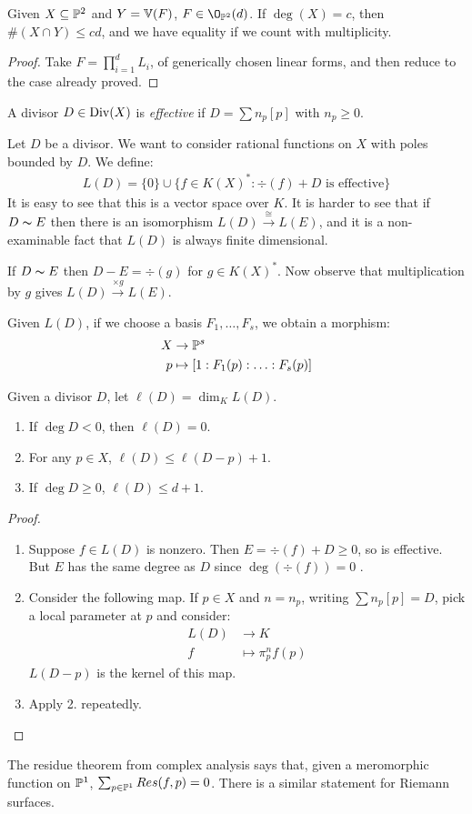 \documentclass[10pt,a4paper,rgb]{article}
\begin{document}
\begin{theorem}
Given $X \subseteq \P^2$ and $Y = \V(F)$, $F \in \O_{\P^2}(d)$. If $\deg(X) = c$, then $\#(X\cap Y) \leq cd$, and we have equality if we count with multiplicity.
\end{theorem}
\begin{proof}
Take $F = \prod_{i=1}^d L_i$, of generically chosen linear forms, and then reduce to the case already proved.
\end{proof}
A divisor $D \in \Div(X)$ is \emph{effective} if $D = \sum n_p[p]$ with $n_p \geq 0$.

Let $D$ be a divisor. We want to consider rational functions on $X$ with poles bounded by $D$. We define:
\begin{align*}
L(D) = \{0\} \cup \{f \in K(X)^{\ast} : \div(f) + D\text{ is effective}\}
\end{align*}
It is easy to see that this is a vector space over $K$. It is harder to see that if $D \thicksim E$ then there is an isomorphism $L(D) \xrightarrow{\cong}L(E)$, and it is a non-examinable fact that $L(D)$ is always finite dimensional.

If $D \thicksim E$ then $D-E = \div(g)$ for $g \in K(X)^{\ast}$. Now observe that multiplication by $g$ gives $L(D) \xrightarrow{\times g} L(E)$.

Given $L(D)$, if we choose a basis $F_1, \ldots, F_s$, we obtain a morphism:
\begin{align*}
X &\to \P^s\\
p &\mapsto [1:F_1(p):\ldots:F_s(p)]
\end{align*}
\begin{proposition}
Given a divisor $D$, let $\ell(D) = \dim_K L(D)$.
\begin{enumerate}
\item If $\deg D < 0$, then $\ell(D) = 0$.
\item For any $p \in X$, $\ell(D) \leq \ell(D-p)+1$.
\item If $\deg D \geq 0$, $\ell(D) \leq d+1$.
\end{enumerate}
\end{proposition}
\begin{proof}
\item
\begin{enumerate}
\item Suppose $f \in L(D)$ is nonzero. Then $E = \div(f) + D \geq 0$, so is effective. But $E$ has the same degree as $D$ since $\deg(\div(f)) = 0$ \contr.
\item Consider the following map. If $p \in X$ and $n = n_p$, writing $\sum n_p[p] = D$, pick a local parameter at $p$ and consider:
\begin{align*}
L(D) &\to K\\
f &\mapsto \pi_p^n f(p)
\end{align*}
$L(D-p)$ is the kernel of this map.
\item Apply 2. repeatedly.
\end{enumerate}
\end{proof}
The residue theorem from complex analysis says that, given a meromorphic function on $\P^1$, $\sum_{p \in \P^1} Res(f,p) = 0$. There is a similar statement for Riemann surfaces.
\end{document}
